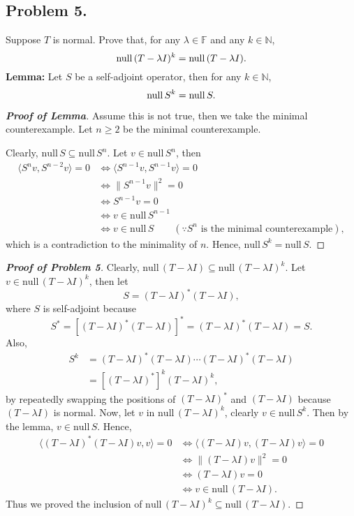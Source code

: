 \documentclass{article}
\newcommand*{\nul}{\ensuremath{\mathrm{null}}\,}
\newcommand*{\F}{\ensuremath{\mathbb{F}}}
\newcommand*{\N}{\ensuremath{\mathbb{N}}}
\begin{document}
\subsection*{Problem 5.}
Suppose $T$ is normal. Prove that, for any $\lambda \in \F$ and any $k\in \N$,
$$ {\rm null}\, (T-\lambda I)^k = {\rm null}\, (T-\lambda I).$$
\textbf{Lemma:} Let $S$ be a self-adjoint operator, then for any $k\in \N$,
$${\rm null}\, S^k = {\rm null}\, S.$$
\begin{proof}[\textbf{Proof of Lemma}]
    Assume this is not true, then we take the minimal counterexample. Let $n \ge 2$ be the minimal
    counterexample.

    Clearly, $\nul S\subseteq \nul S^n$. Let $v\in \nul S^n$, then 
    \begin{align*}
        \langle S^nv, S^{n-2}v\rangle = 0 & \iff \langle S^{n-1}v, S^{n-1}v\rangle = 0 \\
        & \iff \|S^{n-1}v\|^2 = 0 \\
        & \iff S^{n-1}v = 0 \\ 
        & \iff v\in \nul S^{n-1} \\
        & \iff v\in \nul S \qquad (\because S^n \text{ is the minimal counterexample}),
    \end{align*}
    which is a contradiction to the minimality of $n$. Hence, $\nul S^k = \nul S$.
\end{proof}
\begin{proof}[\textbf{Proof of Problem 5}]
    Clearly, $\nul (T-\lambda I)\subseteq \nul (T-\lambda I)^k$. Let $v\in \nul (T-\lambda I)^k$, 
    then let 
    $$S = (T-\lambda I)^*(T-\lambda I),$$
    where $S$ is self-adjoint because 
    $$S^* = [(T-\lambda I)^*(T-\lambda I)]^* = (T-\lambda I)^*(T-\lambda I) = S.$$
    Also, 
    \begin{align*}
        S^k & = (T-\lambda I)^*(T-\lambda I) \cdots (T-\lambda I)^*(T-\lambda I)\\
        & = \left[(T-\lambda I)^*\right]^k(T-\lambda I)^k,
    \end{align*}
    by repeatedly swapping the positions of $(T-\lambda I)^*$ and $(T-\lambda I)$
    because $(T-\lambda I)$ is normal.
    Now, let $v$ in $\nul (T-\lambda I)^k$, clearly $v\in \nul S^k$. Then by the lemma,
    $v\in\nul S$. Hence, 
    \begin{align*}
        \langle (T-\lambda I)^*(T-\lambda I)v, v\rangle = 0 & \iff \langle (T-\lambda I)v, (T-\lambda I)v\rangle = 0 \\
        & \iff \|(T-\lambda I)v\|^2 = 0 \\
        & \iff (T-\lambda I)v = 0 \\
        & \iff v\in \nul (T-\lambda I).
    \end{align*}
    Thus we proved the inclusion of $\nul (T-\lambda I)^k \subseteq \nul (T-\lambda I)$.
\end{proof}
\end{document}
